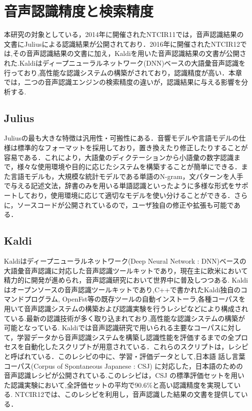 \chapter{音声認識精度と検索精度}
本研究の対象としている，2014年に開催されたNTCIR11では，音声認識結果の文書にJuliusによる認識結果が公開されており．2016年に開催されたNTCIR12では,その音声認識結果の文書に加え，Kaldiを用いた音声認識結果の文書が公開された.Kaldiはディープニューラルネットワーク(DNN)ベースの大語彙音声認識を行っており,高性能な認識システムの構築がされており，認識精度が高い．本章では，二つの音声認識エンジンの検索精度の違いが，認識結果に与える影響を分析する.


\section{Julius}
Julius\cite{julius}の最も大きな特徴は汎用性・可搬性にある．音響モデルや言語モデルの仕様は標準的なフォーマットを採用しており，置き換えたり修正したりすることが容易である．これにより，大語彙のディクテーションから小語彙の数字認識まで，様々な使用環境や目的に応じたシステムを構築することが簡単にできる．また言語モデルも，大規模な統計モデルである単語のN-gram，文パターンを人手で与える記述文法，辞書のみを用いる単語認識といったように多様な形式をサポートしており，使用環境に応じて適切なモデルを使い分けることができる．さらに，ソースコードが公開されているので，ユーザ独自の修正や拡張も可能である．

\section{Kaldi}
Kaldi\cite{kaldi}はディープニューラルネットワーク(Deep Neural Network : DNN)ベースの大語彙音声認識に対応した音声認識ツールキットであり，現在主に欧米において精力的に開発が進められ，音声認識研究において世界中に普及しつつある. Kaldiはオープンソースの音声認識ツールキットであり,C++で書かれたKaldi独自のコマンドプログラム, OpenFst等の既存ツールの自動インストーラ,各種コーパスを用いて音声認識システムの構築および認識実験を行うレシピなどにより構成されている.最新の認識技術が多く取り込まれており,高性能な認識システムの構築が可能となっている.
Kaldiでは音声認識研究で用いられる主要なコーパスに対して，学習データから音声認識システムを構築し認識性能を評価するまでの全プロセスを自動化したスクリプトが用意されている．これらのスクリプトは，レシピと呼ばれている．このレシピの中に、学習・評価データとして,日本語 話し言葉コーパス(Corpus of Spontaneous Japanese : CSJ) \cite{csj} に対応した，日本語のための音声認識レシピが公開されている.このレシピは，CSJ の標準評価セットを用いた認識実験において,全評価セットの平均で90.6\%と高い認識精度を実現している. NTCIR12では、このレシピを利用し，音声認識した結果の文書を提供している．

